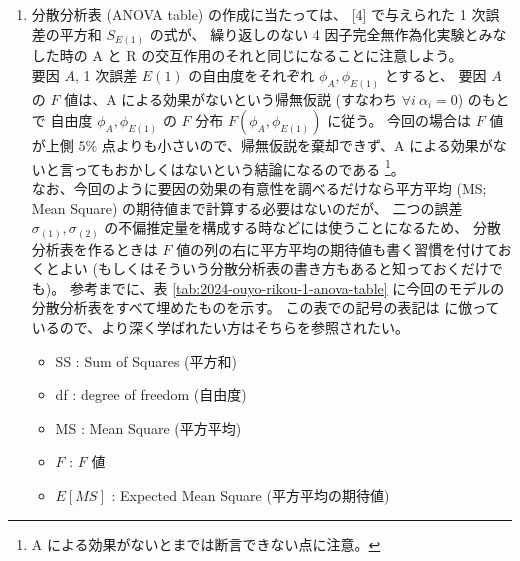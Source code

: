 \documentclass[./main.tex]{subfiles}
\begin{document}
\begin{enumerate}
        \item 分散分析表 (ANOVA table) の作成に当たっては、 
        [4] で与えられた 1 次誤差の平方和 $S_{E(1)}$ の式が、
        繰り返しのない 4 因子完全無作為化実験とみなした時の A と R の交互作用のそれと同じになることに注意しよう。\\
        要因 $A$, 1 次誤差 $E(1)$ の自由度をそれぞれ $\phi_A, \phi_{E(1)}$ とすると、
        要因 $A$ の $F$ 値は、A による効果がないという帰無仮説 (すなわち $\forall i \ \alpha_i = 0$) のもとで
        自由度 $\phi_A, \phi_{E(1)}$ の $F$ 分布 $F(\phi_A, \phi_{E(1)})$ に従う。
        今回の場合は $F$ 値が上側 $5\%$ 点よりも小さいので、帰無仮説を棄却できず、A による効果がないと言ってもおかしくはないという結論になるのである
        \footnote{A による効果がないとまでは断言できない点に注意。}。\\
        なお、今回のように要因の効果の有意性を調べるだけなら平方平均 (MS; Mean Square) の期待値まで計算する必要はないのだが、
        二つの誤差 $\sigma_{(1)}, \sigma_{(2)}$ の不偏推定量を構成する時などには使うことになるため、
        分散分析表を作るときは $F$ 値の列の右に平方平均の期待値も書く習慣を付けておくとよい (もしくはそういう分散分析表の書き方もあると知っておくだけでも)。
        参考までに、表 \ref{tab:2024-ouyo-rikou-1-anova-table} に今回のモデルの分散分析表をすべて埋めたものを示す。
        この表での記号の表記は \cite{kutner:2005} に倣っているので、より深く学ばれたい方はそちらを参照されたい。
        \begin{itemize}
            \item SS : Sum of Squares (平方和)
            \item df : degree of freedom (自由度)
            \item MS : Mean Square (平方平均)
            \item $F$ : $F$ 値
            \item $E[MS]$ : Expected Mean Square (平方平均の期待値)
        \end{itemize}


        \begin{landscape}
            

\end{landscape}
\end{enumerate}
\end{document}
